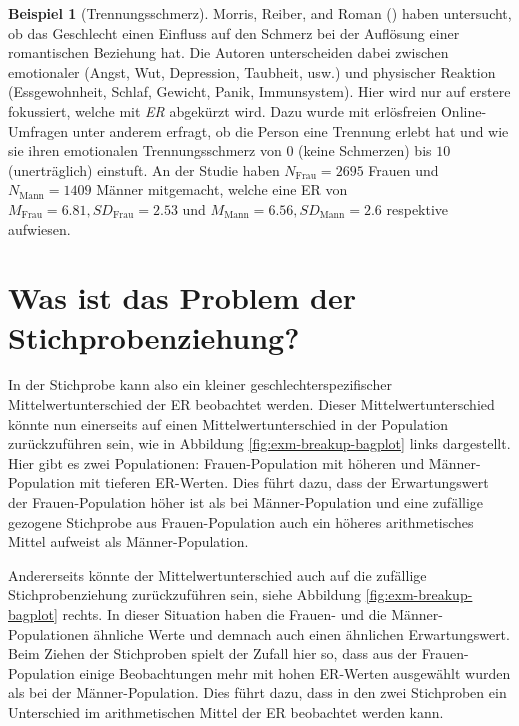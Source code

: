 \documentclass[
]{book}
\theoremstyle{definition}
\theoremstyle{definition}
\newtheorem{example}{Beispiel}[chapter]
\theoremstyle{definition}
\theoremstyle{definition}
\theoremstyle{remark}
\begin{document}
\begin{example}[Trennungsschmerz]
\protect\hypertarget{exm:breakup}{}\label{exm:breakup}Morris, Reiber, and Roman () haben untersucht, ob das Geschlecht einen Einfluss auf den Schmerz bei der Auflösung einer romantischen Beziehung hat. Die Autoren unterscheiden dabei zwischen emotionaler (Angst, Wut, Depression, Taubheit, usw.) und physischer Reaktion (Essgewohnheit, Schlaf, Gewicht, Panik, Immunsystem). Hier wird nur auf erstere fokussiert, welche mit \emph{ER} abgekürzt wird. Dazu wurde mit erlösfreien Online-Umfragen unter anderem erfragt, ob die Person eine Trennung erlebt hat und wie sie ihren emotionalen Trennungsschmerz von \(0\) (keine Schmerzen) bis \(10\) (unerträglich) einstuft. An der Studie haben \(N_\text{Frau} = 2695\) Frauen und \(N_\text{Mann} = 1409\) Männer mitgemacht, welche eine ER von \(M_\text{Frau} = 6.81, SD_\text{Frau} = 2.53\) und \(M_\text{Mann} = 6.56, SD_\text{Mann} = 2.6\) respektive aufwiesen.
\end{example}

\section{Was ist das Problem der Stichprobenziehung?}\label{was-ist-das-problem-der-stichprobenziehung}

In der Stichprobe kann also ein kleiner geschlechterspezifischer Mittelwertunterschied der ER beobachtet werden. Dieser Mittelwertunterschied könnte nun einerseits auf einen Mittelwertunterschied in der Population zurückzuführen sein, wie in Abbildung \ref{fig:exm-breakup-bagplot} links dargestellt. Hier gibt es zwei Populationen: Frauen-Population mit höheren und Männer-Population mit tieferen ER-Werten. Dies führt dazu, dass der Erwartungswert der Frauen-Population höher ist als bei Männer-Population und eine zufällige gezogene Stichprobe aus Frauen-Population auch ein höheres arithmetisches Mittel aufweist als Männer-Population.

Andererseits könnte der Mittelwertunterschied auch auf die zufällige Stichprobenziehung zurückzuführen sein, siehe Abbildung \ref{fig:exm-breakup-bagplot} rechts. In dieser Situation haben die Frauen- und die Männer-Populationen ähnliche Werte und demnach auch einen ähnlichen Erwartungswert. Beim Ziehen der Stichproben spielt der Zufall hier so, dass aus der Frauen-Population einige Beobachtungen mehr mit hohen ER-Werten ausgewählt wurden als bei der Männer-Population. Dies führt dazu, dass in den zwei Stichproben ein Unterschied im arithmetischen Mittel der ER beobachtet werden kann.
\end{document}
